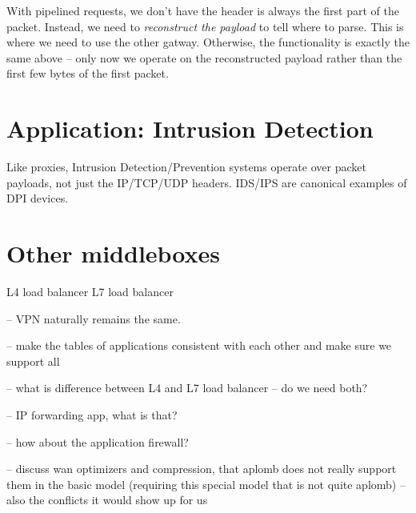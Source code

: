 With pipelined requests, we don't have the header is always the first part of the packet. Instead, we need to {\it reconstruct the payload} to tell where to parse. This is where we need to use the other gatway. Otherwise, the functionality is exactly the same above -- only now we operate on the reconstructed payload rather than the first few bytes of the first packet.


\section{Application: Intrusion Detection}
Like proxies, Intrusion Detection/Prevention systems operate over packet payloads, not just the IP/TCP/UDP headers.
IDS/IPS are canonical examples of DPI devices.


\section{Other middleboxes}\label{sec:vpn} \label{sec:other_apps} \label{sec:not_supp}\label{sec:loadb}


L4 load balancer
L7 load balancer

-- VPN naturally remains the same. 

-- make the tables of applications consistent with each other and make sure we support all 

-- what is difference between L4 and L7 load balancer -- do we need both?

-- IP forwarding app, what is that?

-- how about the application firewall?

-- discuss wan optimizers and compression, that aplomb does not really support them in the basic model (requiring this special model that is not quite aplomb) -- also the conflicts it would show up for us

